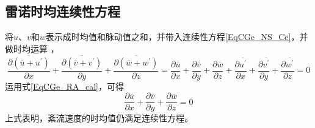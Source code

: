\subsection{雷诺时均连续性方程}
将$u$、$v$和$w$表示成时均值和脉动值之和，并带入连续性方程\eqref{EqCGe_NS_Ce}，并做时均运算
，
\begin{equation*}
  \overline{
    \frac{\partial(\overline{u}+u^{\prime})}{\partial x} 
  }
  +
  \overline{
    \frac{\partial(\overline{v}+v^{\prime})}{\partial y} 
  }
  +
  \overline{
    \frac{\partial(\overline{w}+w^{\prime})}{\partial z} 
  }
  =
    \frac{\partial \overline{u}}{\partial x} +
    \frac{\partial \overline{v}}{\partial y} +
    \frac{\partial \overline{w}}{\partial z} +
    \frac{\partial \overline{u^{\prime}}}{\partial x} +
    \frac{\partial \overline{v^{\prime}}}{\partial y} +
    \frac{\partial \overline{w^{\prime}}}{\partial z}
    =0
\end{equation*}
运用式\eqref{EqCGe_RA_cal}，可得
\begin{equation}
    \frac{\partial \overline{u}}{\partial x} +
    \frac{\partial \overline{v}}{\partial y} +
    \frac{\partial \overline{w}}{\partial z}
    =
    0
\end{equation}
上式表明，紊流速度的时均值仍满足连续性方程。

